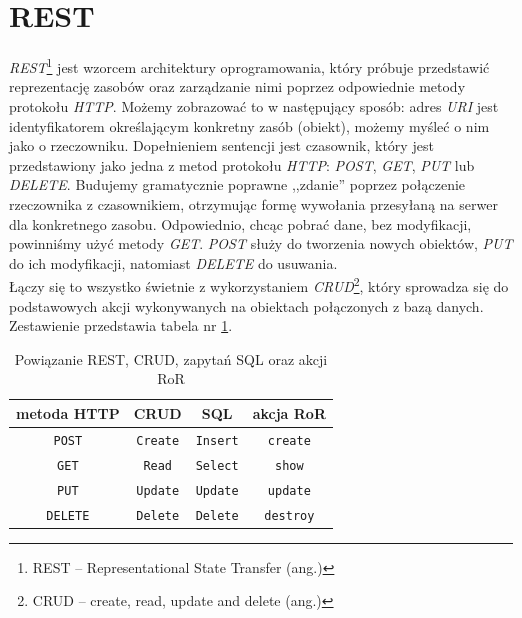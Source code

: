 \documentclass[12pt,twoside]{report}
\begin{document}
\section{REST}\label{sec:rest}
\emph{REST}\footnote{REST -- Representational State Transfer (ang.)} jest wzorcem
architektury oprogramowania, który próbuje przedstawić reprezentację zasobów oraz
zarządzanie nimi poprzez odpowiednie metody protokołu \emph{HTTP}. Możemy zobrazować to w
następujący sposób: adres \emph{URI} jest identyfikatorem określającym konkretny zasób
(obiekt), możemy myśleć o nim jako o rzeczowniku. Dopełnieniem sentencji jest czasownik,
który jest przedstawiony jako jedna z metod protokołu \emph{HTTP}: \emph{POST}, \emph{GET},
\emph{PUT} lub \emph{DELETE}. Budujemy gramatycznie poprawne ,,zdanie'' poprzez
połączenie rzeczownika z czasownikiem, otrzymując formę wywołania przesyłaną na serwer dla
konkretnego zasobu. Odpowiednio, chcąc pobrać dane, bez modyfikacji, powinniśmy użyć
metody \emph{GET}. \emph{POST} służy do tworzenia nowych obiektów, \emph{PUT} do ich
modyfikacji, natomiast \emph{DELETE} do usuwania.\\
Łączy się to wszystko świetnie z wykorzystaniem \emph{CRUD}\footnote{CRUD -- create, read,
update and delete (ang.)}, który sprowadza się do podstawowych akcji wykonywanych na
obiektach połączonych z bazą danych. Zestawienie przedstawia tabela nr \ref{table:rest}.

\begin{table}[htcb]
  \begin{center}
    \begin{tabular}{|c|c|c|c|}
      \hline
      \textbf{metoda HTTP} & \textbf{CRUD} & \textbf{SQL} & \textbf{akcja RoR}\\
      \hline
      \texttt{POST} & \texttt{Create} & \texttt{Insert} & \texttt{create}\\
      \texttt{GET} & \texttt{Read} & \texttt{Select} & \texttt{show}\\
      \texttt{PUT} & \texttt{Update} & \texttt{Update} & \texttt{update}\\
      \texttt{DELETE} & \texttt{Delete} & \texttt{Delete} & \texttt{destroy}\\
      \hline
    \end{tabular}
  \end{center}
  \caption{Powiązanie REST, CRUD, zapytań SQL oraz akcji RoR}
  \label{table:rest}
\end{table}
\end{document}
